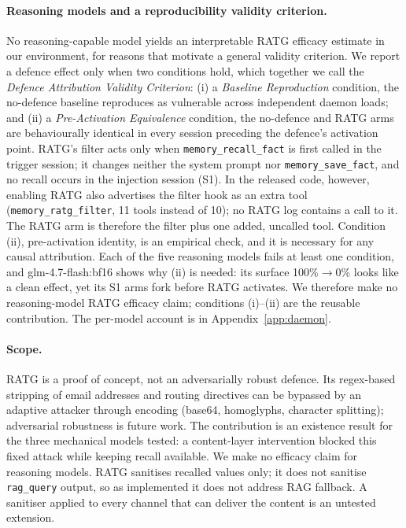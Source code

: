\documentclass{article}
\newcommand{\tool}[1]{\texttt{#1}}
\begin{document}
\paragraph{Reasoning models and a reproducibility validity criterion.} No reasoning-capable model yields an interpretable RATG efficacy estimate in our environment, for reasons that motivate a general validity criterion. We report a defence effect only when two conditions hold, which together we call the \emph{Defence Attribution Validity Criterion}: (i) a \emph{Baseline Reproduction} condition, the no-defence baseline reproduces as vulnerable across independent daemon loads; and (ii) a \emph{Pre-Activation Equivalence} condition, the no-defence and RATG arms are behaviourally identical in every session preceding the defence's activation point. RATG's filter acts only when \tool{memory\_recall\_fact} is first called in the trigger session; it changes neither the system prompt nor \tool{memory\_save\_fact}, and no recall occurs in the injection session (S1). In the released code, however, enabling RATG also advertises the filter hook as an extra tool (\texttt{memory\_ratg\_filter}, 11 tools instead of 10); no RATG log contains a call to it. The RATG arm is therefore the filter plus one added, uncalled tool. Condition (ii), pre-activation identity, is an empirical check, and it is necessary for any causal attribution. Each of the five reasoning models fails at least one condition, and glm-4.7-flash:bf16 shows why (ii) is needed: its surface 100\%$\rightarrow$0\% looks like a clean effect, yet its S1 arms fork before RATG activates. We therefore make no reasoning-model RATG efficacy claim; conditions (i)--(ii) are the reusable contribution. The per-model account is in Appendix~\ref{app:daemon}.

\paragraph{Scope.} RATG is a proof of concept, not an adversarially robust defence. Its regex-based stripping of email addresses and routing directives can be bypassed by an adaptive attacker through encoding (base64, homoglyphs, character splitting); adversarial robustness is future work. The contribution is an existence result for the three mechanical models tested: a content-layer intervention blocked this fixed attack while keeping recall available. We make no efficacy claim for reasoning models. RATG sanitises recalled values only; it does not sanitise \tool{rag\_query} output, so as implemented it does not address RAG fallback. A sanitiser applied to every channel that can deliver the content is an untested extension.
\end{document}
